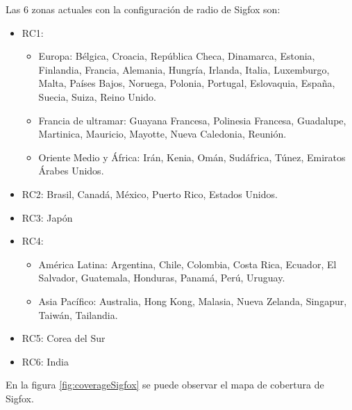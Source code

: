 Las 6 zonas  actuales con la configuración de radio de Sigfox son:
\begin{itemize}
    \item RC1:
        \begin{itemize}
            \item Europa: Bélgica, Croacia, República Checa, Dinamarca, Estonia, Finlandia, Francia, Alemania, Hungría, Irlanda, Italia, Luxemburgo, Malta, Países Bajos, Noruega, Polonia, Portugal, Eslovaquia, España, Suecia, Suiza, Reino Unido.
            \item Francia de ultramar: Guayana Francesa, Polinesia Francesa, Guadalupe, Martinica, Mauricio, Mayotte, Nueva Caledonia, Reunión.
            \item Oriente Medio y África: Irán, Kenia, Omán, Sudáfrica, Túnez, Emiratos Árabes Unidos.
        \end{itemize}
    \item RC2: Brasil, Canadá, México, Puerto Rico, Estados Unidos.
    \item RC3: Japón
    \item RC4:
        \begin{itemize}
            \item América Latina: Argentina, Chile, Colombia, Costa Rica, Ecuador, El Salvador, Guatemala, Honduras, Panamá, Perú, Uruguay.
            \item Asia Pacífico: Australia, Hong Kong, Malasia, Nueva Zelanda, Singapur, Taiwán, Tailandia.
        \end{itemize}
    \item RC5: Corea del Sur
    \item RC6: India

\end{itemize}

En la figura \ref{fig:coverageSigfox} se puede observar el mapa de cobertura de Sigfox.

